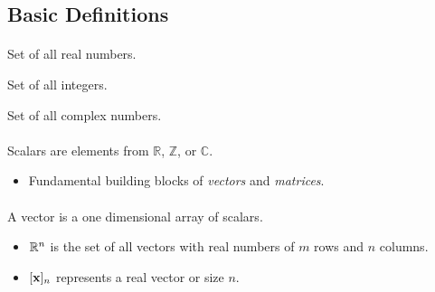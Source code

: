 \documentclass[../../main.tex]{subfiles}
\begin{document}
\subsection{Basic Definitions}


\paragraph{ }
 Set of all real numbers. 


 Set of all integers. 

 Set of all complex numbers. 

\paragraph{ }
Scalars are elements from $\mathbb{R}$, $\mathbb{Z}$, or $\mathbb{C}$.
\begin{itemize}
  \item Fundamental building blocks of \textit{vectors} and \textit{matrices}.
\end{itemize}

\paragraph{ }
A vector is a one dimensional array of scalars. 
\begin{itemize}
  \item $\mathbb{R}^n$ is the set of all vectors with real numbers of $m$ rows and $n$ columns.
  \item $[\mathbf{x}]_{n}$ represents a real vector or size $n$.
\end{itemize}
\end{document}

